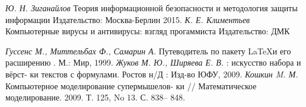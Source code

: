 \begin{thebibliography}{00}
\textit{Ю. Н. Зиганайлов} Теория информационной безопасности и методология защиты информации Издательство: Москва-Берлин 2015.
\textit{К. Е. Климентьев} Компьютерные вирусы и антивирусы: взгляд прогаммиста Издательство: ДМК


\textit{Гуссенс М., Миттельбах Ф., Самарин А.} Путеводитель по пакету
\LaTeX и его расширению \LaTeXe . М.: Мир, 1999.
\textit{Жуков М. Ю., Ширяева Е. В.} \LaTeXe : искусство набора и вёрст-
ки текстов с формулами. Ростов н/Д : Изд-во ЮФУ, 2009.
\textit{Кошкин M. М.} Компьютерное моделирование супермышелов-
ки // Математическое моделирование. 2009. Т. 125, No 13. С. 838–
848.
\end{thebibliography}